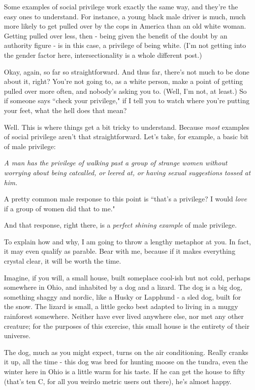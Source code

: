 \documentclass[11pt]{article}
\begin{document}
Some examples of social privilege work exactly the same way, and they're the easy ones to understand. For instance, a young black male driver is much, much more likely to get pulled over by the cops in America than an old white woman. Getting pulled over less, then - being given the benefit of the doubt by an authority figure - is in this case, a privilege of being white. (I'm not getting into the gender factor here, intersectionality is a whole different post.)

Okay, again, so far so straightforward. And thus far, there's not much to be done about it, right? You're not going to, as a white person, make a point of getting pulled over more often, and nobody's asking you to. (Well, I'm not, at least.) So if someone says ``check your privilege," if I tell you to watch where you're putting your feet, what the hell does that mean?

Well. This is where things get a bit tricky to understand. Because {\it most}  examples of social privilege aren't that straightforward. Let's take, for example, a basic bit of male privilege:

{\it A man has the privilege of walking past a group of strange women without worrying about being catcalled, or leered at, or having sexual suggestions tossed at him.} 

A pretty common male response to this point is ``that's a privilege? I would {\it love}  if a group of women did that to me."

And that response, right there, is a {\it perfect shining example}  of male privilege.

To explain how and why, I am going to throw a lengthy metaphor at you. In fact, it may even qualify as parable. Bear with me, because if it makes everything crystal clear, it will be worth the time.

Imagine, if you will, a small house, built someplace cool-ish but not cold, perhaps somewhere in Ohio, and inhabited by a dog and a lizard. The dog is a big dog, something shaggy and nordic, like a Husky or Lapphund - a sled dog, built for the snow. The lizard is small, a little gecko best adapted to living in a muggy rainforest somewhere. Neither have ever lived anywhere else, nor met any other creature; for the purposes of this exercise, this small house is the entirety of their universe.

The dog, much as you might expect, turns on the air conditioning. Really cranks it up, all the time - this dog was bred for hunting moose on the tundra, even the winter here in Ohio is a little warm for his taste. If he can get the house to fifty (that's ten C, for all you weirdo metric users out there), he's almost happy.
\end{document}
